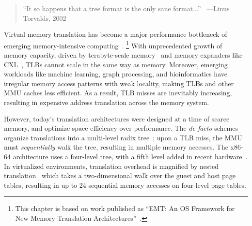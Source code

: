 
\begin{quote}
	``It so happens that a tree format is the only sane format...''~\cite{linux:torvalds_pt}
	---Linus Torvalds, 2002
\end{quote}


Virtual memory translation has become a major performance bottleneck
	of emerging memory-intensive computing~\cite{basu2013efficient,gupta2021midgard,
		skarlatos2020ecpt,park2022fpt,kanellopoulos2023utopia,margaritov2019asap,kwon2016coordinated}.%
\footnote{This chapter is based on work published as ``EMT: An OS Framework for New Memory Translation Architectures''~\cite{chai:osdi:25}.}
With unprecedented growth of memory capacity,
	driven by terabyte-scale memory~\cite{news:aws:18tb,news:gcloud:12tb} 
	and
	memory expanders like CXL~\cite{li2023pond,sharma2023cxl},
TLBs cannot scale in the same way as memory.
Moreover, emerging workloads like 
	machine learning, graph processing, and bioinformatics
	have irregular memory access patterns with weak locality, making
	TLBs and other MMU caches less efficient.
As a result, TLB misses are inevitably increasing, resulting in
	expensive address translation
	across the memory system.

However, today's translation architectures were 
	designed at a time
	of scarce memory, and optimize 
	space-efficiency over performance.
The {\it de facto} schemes organize translations
	into a multi-level radix tree~\cite{intel:man,amd:man,aarch64:man};
upon a TLB miss, the MMU must {\it sequentially} walk the tree, resulting in multiple memory accesses.
The x86-64 architecture uses a four-level
	tree, with a fifth level added in recent hardware~\cite{intel:5level,intel:5level:implement}. %
In virtualized environments, translation overhead is magnified by nested translation~\cite{bhargava2008accelerating,merrifield2016performance}
	which takes
	a two-dimensional 
	walk over the guest and host page tables, resulting in up to
24 sequential memory accesses on four-level page tables. %


